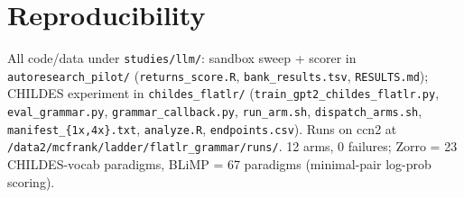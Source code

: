 \documentclass[11pt]{article}
\begin{document}
\section*{Reproducibility}
All code/data under \texttt{studies/llm/}: sandbox sweep + scorer in \texttt{autoresearch\_pilot/}
(\texttt{returns\_score.R}, \texttt{bank\_results.tsv}, \texttt{RESULTS.md}); CHILDES experiment in
\texttt{childes\_flatlr/} (\texttt{train\_gpt2\_childes\_flatlr.py}, \texttt{eval\_grammar.py},
\texttt{grammar\_callback.py}, \texttt{run\_arm.sh}, \texttt{dispatch\_arms.sh}, \texttt{manifest\_\{1x,4x\}.txt},
\texttt{analyze.R}, \texttt{endpoints.csv}). Runs on ccn2 at \texttt{/data2/mcfrank/ladder/flatlr\_grammar/runs/}.
12 arms, 0 failures; Zorro = 23 CHILDES-vocab paradigms, BLiMP = 67 paradigms (minimal-pair log-prob scoring).
\end{document}
